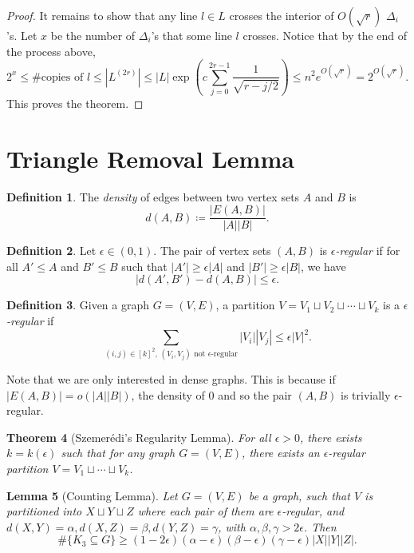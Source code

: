 \documentclass[12pt,reqno]{amsart}
\newtheorem{theorem}{Theorem}[section]
\newtheorem{lemma}[theorem]{Lemma}
\theoremstyle{definition}
\newtheorem{definition}[theorem]{Definition}
\theoremstyle{remark}
\renewcommand{\leq}{\leqslant}
\renewcommand{\geq}{\geqslant}
\numberwithin{equation}{section}
\begin{document}
\begin{proof}
	It remains to show that any line $l \in L$ crosses the interior of $O(\sqrt{r})$ $\Delta_i$'s. Let $x$ be the number of $\Delta_i$'s that some line $l$ crosses. Notice that by the end of the process above,
	\[
		2^x \leq \#\text{copies of $l$} \leq |L^{(2r)}| \leq |L|\exp\left(c\sum_{j = 0}^{2r - 1} \frac{1}{\sqrt{r - j/2}}\right) \leq n^2e^{O(\sqrt{r})} = 2^{O(\sqrt{r})}.
	\]
	This proves the theorem.
\end{proof}

\newpage

\section{Triangle Removal Lemma}

\begin{definition}
	The \textit{density} of edges between two vertex sets $A$ and $B$ is 
	\[
		d(A, B) \coloneq \frac{|E(A, B)|}{|A||B|}.
	\]
\end{definition}

\begin{definition}
	Let $\epsilon \in (0, 1)$. The pair of vertex sets $(A, B)$ is \textit{$\epsilon$-regular} if for all $A' \leq A$ and $B' \leq B$ such that $|A'| \geq \epsilon |A|$ and $|B'| \geq \epsilon |B|$, we have
	\[
		|d(A', B') - d(A, B)| \leq \epsilon.
	\]
\end{definition}

\begin{definition}
	Given a graph $G = (V, E)$, a partition $V = V_1 \sqcup V_2 \sqcup \cdots \sqcup V_k$ is a \textit{$\epsilon$-regular} if 
	\[
		\sum_{(i, j) \in [k]^2, \, (V_i, V_j) \text{ not $\epsilon$-regular}} |V_i||V_j| \leq \epsilon |V|^2.
	\]
\end{definition}

Note that we are only interested in dense graphs. This is because if $|E(A, B)| = o(|A||B|)$, the density of $0$ and so the pair $(A, B)$ is trivially $\epsilon$-regular.

\begin{theorem}[Szemerédi's Regularity Lemma]
	For all $\epsilon > 0$, there exists $k = k(\epsilon)$ such that for any graph $G = (V, E)$, there exists an $\epsilon$-regular partition $V = V_1 \sqcup \cdots \sqcup V_k$.
\end{theorem}

\begin{lemma}[Counting Lemma]
	Let $G = (V, E)$ be a graph, such that $V$ is partitioned into $X \sqcup Y \sqcup Z$ where each pair of them are $\epsilon$-regular, and $d(X, Y) = \alpha, d(X, Z) = \beta, d(Y, Z) = \gamma$, with $\alpha, \beta, \gamma > 2\epsilon$. Then
	\[
		\#\{K_3 \subseteq G\} \geq (1 - 2\epsilon)(\alpha - \epsilon)(\beta - \epsilon)(\gamma - \epsilon)|X||Y||Z|.
	\]
\end{lemma}
\end{document}
